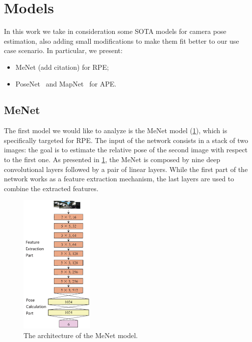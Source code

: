 \section{Models}
In this work we take in consideration some SOTA models for camera pose estimation, also adding small modifications to make them fit better to our use case scenario.
In particular, we present:
\begin{itemize}
    \item MeNet (add citation) for RPE;
    \item PoseNet~\cite{9348762} and MapNet~\cite{DBLP:journals/corr/abs-1712-03342} for APE.
\end{itemize}

\subsection{MeNet}
The first model we would like to analyze is the MeNet model (\cref{fig:menet-structure}), which is specifically targeted for RPE.
The input of the network consists in a stack of two images: the goal is to estimate the relative pose of the second image with respect to the first one.
As presented in \cref{fig:menet-structure}, the MeNet is composed by nine deep convolutional layers followed by a pair of linear layers. While the first part of the network works as a feature extraction mechanism, the last layers are used to combine the extracted features.
\begin{figure}
    \begin{center}
        \includegraphics[width=0.32\textwidth]{./imgs/menet_structure.png}
    \end{center}
    \caption{The architecture of the MeNet model.}
    \label{fig:menet-structure}
\end{figure}

